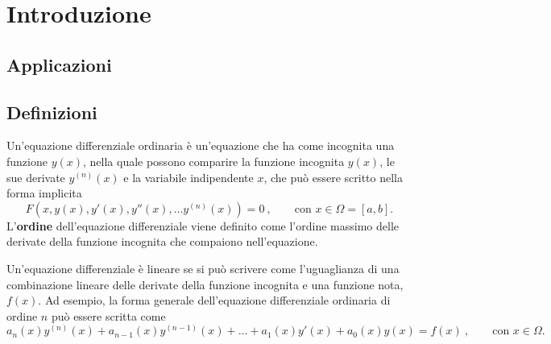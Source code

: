 
\chapter{Introduzione}
\section{Applicazioni}

\section{Definizioni}
\begin{definition} Un'equazione differenziale ordinaria è un'equazione che ha come incognita una funzione $y(x)$, nella quale possono comparire la funzione incognita $y(x)$, le sue derivate $y^{(n)}(x)$ e la variabile indipendente $x$, che può essere scritto nella forma implicita
\begin{equation}\label{ode:def}
  F\left(x,y(x),y'(x), y''(x), \dots y^{(n)}(x) \right) = 0 \ , \qquad \text{con $x \in \Omega = [a,b]$}.
\end{equation}
L'\textbf{ordine} dell'equazione differenziale viene definito come l'ordine massimo delle derivate della funzione incognita che compaiono nell'equazione.
\end{definition}

\begin{definition} Un'equazione differenziale è lineare se si può scrivere come l'uguaglianza di una combinazione lineare delle derivate della funzione incognita e una funzione nota, $f(x)$. Ad esempio, la forma generale dell'equazione differenziale ordinaria di ordine $n$ può essere scritta come
\begin{equation}
    a_n(x) y^{(n)}(x) + a_{n-1}(x) y^{(n-1)}(x) + \dots + a_1(x) y'(x) + a_0(x) y(x) = f(x) \ , \qquad \text{con $x \in \Omega$}.
\end{equation}
\end{definition}

